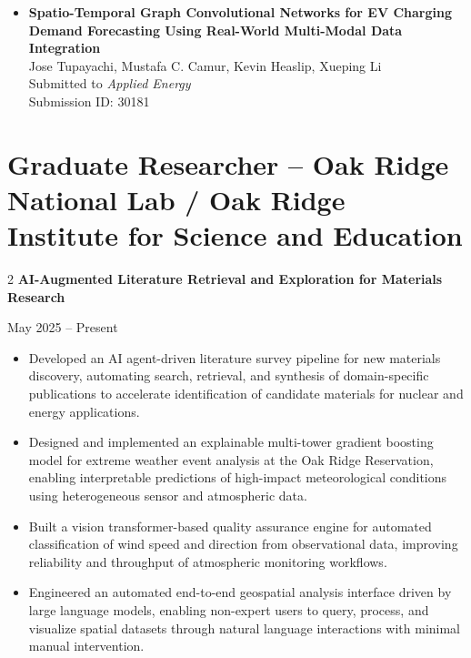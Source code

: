 \documentclass[10pt, letterpaper]{article}
\newenvironment{highlights}{
    \begin{itemize}[
        topsep=0.10 cm,
        parsep=0.10 cm,
        partopsep=0pt,
        itemsep=0pt,
        leftmargin=0 cm + 10pt
    ]
}{
    \end{itemize}
} %
\newenvironment{twocolentry}[2][]{
    \onecolentry
    \def\secondColumn{#2}
    \setcolumnwidth{\fill, 4.5 cm}
    \begin{paracol}{2}
}{
    \switchcolumn \raggedleft \secondColumn
    \end{paracol}
    \endonecolentry
} %
\begin{document}
\begin{itemize}[left=0pt]
    \item \textbf{Spatio-Temporal Graph Convolutional Networks for EV Charging Demand Forecasting Using Real-World Multi-Modal Data Integration}\\
    Jose Tupayachi, Mustafa C. Camur, Kevin Heaslip, Xueping Li\\
    Submitted to \textit{Applied Energy} \\
    Submission ID: 30181





\end{itemize}

    
\section*{Graduate Researcher – Oak Ridge National Lab / Oak Ridge Institute for Science and Education}
\small

\vspace{0.3cm} \begin{twocolentry}{May 2025 – Present} \textbf{AI-Augmented Literature Retrieval and Exploration for Materials Research} \textbar
 \end{twocolentry}

\begin{highlights}
    \item Developed an AI agent-driven literature survey pipeline for new materials discovery, automating search, retrieval, and synthesis of domain-specific publications to accelerate identification of candidate materials for nuclear and energy applications.
    \item Designed and implemented an explainable multi-tower gradient boosting model for extreme weather event analysis at the Oak Ridge Reservation, enabling interpretable predictions of high-impact meteorological conditions using heterogeneous sensor and atmospheric data.
    \item Built a vision transformer-based quality assurance engine for automated classification of wind speed and direction from observational data, improving reliability and throughput of atmospheric monitoring workflows.
    \item Engineered an automated end-to-end geospatial analysis interface driven by large language models, enabling non-expert users to query, process, and visualize spatial datasets through natural language interactions with minimal manual intervention.
\end{highlights}
\end{document}
